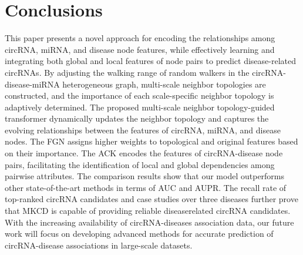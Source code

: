 \documentclass[journal,twoside,web]{ieeecolor}
\begin{document}
\section{Conclusions}
This paper presents a novel approach for encoding the relationships among circRNA, miRNA, and disease node features, while effectively learning and integrating both global and local features of node pairs to predict disease-related circRNAs. By adjusting the walking range of random walkers in the circRNA-disease-miRNA heterogeneous graph, multi-scale neighbor topologies are constructed, and the importance of each scale-specific neighbor topology is adaptively determined. The proposed multi-scale neighbor topology-guided transformer dynamically updates the neighbor topology and captures the evolving relationships between the features of circRNA, miRNA, and disease nodes. The FGN assigns higher weights to topological and original features based on their importance. The ACK encodes the features of circRNA-disease node pairs, facilitating the identification of local and global dependencies among pairwise attributes. The comparison results show that our model outperforms other state-of-the-art methods in terms of AUC and AUPR. The recall rate of top-ranked circRNA candidates and case studies over three diseases further prove that MKCD is capable of providing reliable diseaserelated circRNA candidates. 
With the increasing availability of circRNA-diseases association data, our future work will focus on developing advanced methods for accurate prediction of circRNA-disease associations in large-scale datasets.


\end{document}

